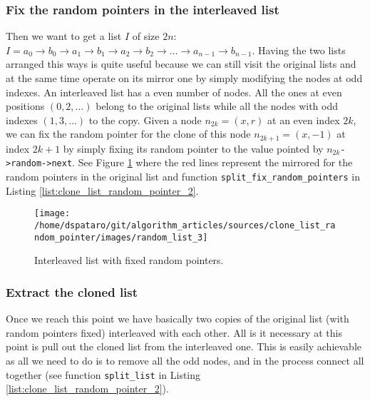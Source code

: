 \subsubsection{Fix the random pointers in the interleaved list}
Then we want to get a list $I$ of size $2n$: $I=a_0 \rightarrow b_0 \rightarrow a_1 \rightarrow b_1 \rightarrow a_2 \rightarrow b_2 \rightarrow \ldots \rightarrow a_{n-1} \rightarrow b_{n-1}$. Having the two lists arranged this ways is quite useful because we can still visit the original lists and at the same time operate on its mirror one by simply modifying the nodes at odd indexes. An interleaved list has a even number of nodes. All the ones at even positions $(0,2,\ldots)$ belong to the original lists while all the nodes with odd indexes $(1,3,\ldots)$ to the copy. Given a node $n_{2k}=(x,r)$ at an even index $2k$, we can fix the random pointer for the clone of this node $n_{2k+1}=(x,-1)$ at index $2k+1$ by simply fixing its random pointer to the value pointed by $n_{2k}$\lstinline[columns=fixed]{->random->next}. See Figure \ref{fig:clone_list_random_pointer:interleaved_fixed} where the red lines represent the mirrored for the random pointers in the original list and function \lstinline[columns=fixed]{split_fix_random_pointers} in Listing \ref{list:clone_list_random_pointer_2}.

\begin{figure}
	\label{fig:clone_list_random_pointer:interleaved_fixed}
	\centering
	\texttt{[image: /home/dspataro/git/algorithm\_articles/sources/clone\_list\_random\_pointer/images/random\_list\_3]}
	\caption{Interleaved list with fixed random pointers.}
\end{figure}

\subsubsection{Extract the cloned list}
Once we reach this point we have basically two copies of the original list (with random pointers fixed) interleaved with each other. All is it necessary at this point is pull out the cloned list from the interleaved one. This is easily achievable as all we need to do is to remove all the odd nodes, and in the process connect all together (see function \lstinline[columns=fixed]{split_list} in Listing \ref{list:clone_list_random_pointer_2}).


